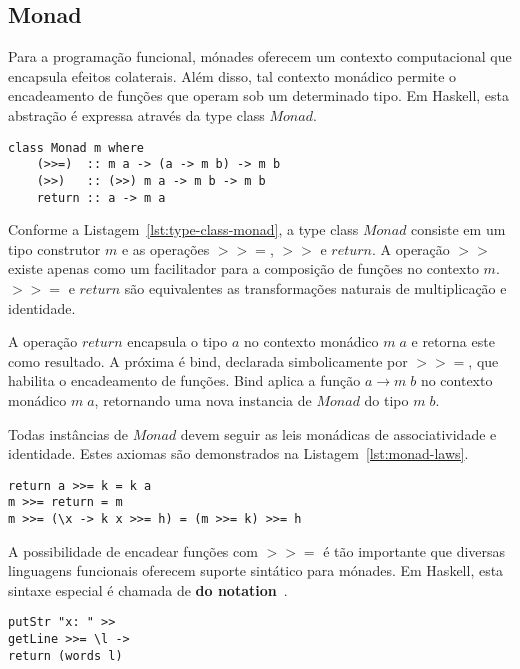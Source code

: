 \documentclass[10pt, conference]{IEEEtran}
\begin{document}
\subsection{Monad}

Para a programação funcional, mónades oferecem um contexto computacional que encapsula efeitos colaterais. Além disso, tal contexto monádico permite o encadeamento de funções que operam sob um determinado tipo. Em Haskell, esta abstração é expressa através da type class $Monad$.

\begin{lstlisting}[caption={Type class Monad\protect\footref{fnt:haskell-language-report}}, label={lst:type-class-monad}]
class Monad m where
	(>>=)  :: m a -> (a -> m b) -> m b
	(>>)   :: (>>) m a -> m b -> m b
	return :: a -> m a
\end{lstlisting}

Conforme a Listagem~\ref{lst:type-class-monad}, a type class $Monad$ consiste em um tipo construtor $m$ e as operações $>>=$, $>>$ e $return$. A operação $>>$ existe apenas como um facilitador para a composição de funções no contexto $m$. $>>=$ e $return$ são equivalentes as transformações naturais de multiplicação e identidade.

A operação $return$ encapsula o tipo $a$ no contexto monádico $m\;a$ e retorna este como resultado. A próxima é bind, declarada simbolicamente por $>>=$, que habilita o encadeamento de funções. Bind aplica a função $a \rightarrow m\;b$ no contexto monádico $m\;a$, retornando uma nova instancia de $Monad$ do tipo $m\;b$.

Todas instâncias de $Monad$ devem seguir as leis monádicas de associatividade e identidade. Estes axiomas são demonstrados na Listagem~\ref{lst:monad-laws}.

\begin{lstlisting}[caption={Leis para $Monad$\protect\footref{fnt:haskell-language-report}}, label={lst:monad-laws}]
return a >>= k = k a
m >>= return = m
m >>= (\x -> k x >>= h) = (m >>= k) >>= h
\end{lstlisting}

A possibilidade de encadear funções com $>>=$ é tão importante que diversas linguagens funcionais oferecem suporte sintático para mónades. Em Haskell, esta sintaxe especial é chamada de \textbf{do notation}~\cite{marlow2010haskell}.

\begin{lstlisting}[caption={Encadeando Funções com Bind e Then\protect\footref{fnt:haskell-language-report}}, label={lst:func-chaining}]
putStr "x: " >>
getLine >>= \l -> 
return (words l)
\end{lstlisting}
\end{document}
